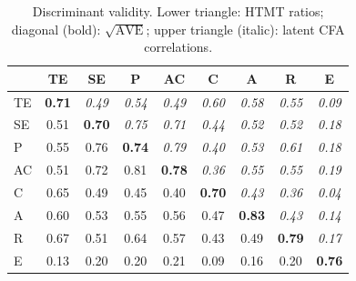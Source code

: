 \begin{table}[!htbp]
\centering
\caption{Discriminant validity. Lower triangle: HTMT ratios; diagonal (bold): $\sqrt{\mathrm{AVE}}$; upper triangle (italic): latent CFA correlations.}
\label{tab:htmt}
\footnotesize
\setlength{\tabcolsep}{3.5pt}
\begin{tabular}{lcccccccc}
\toprule
 & TE & SE & P & AC & C & A & R & E\\
\midrule
TE & \textbf{0.71} & \textit{0.49} & \textit{0.54} & \textit{0.49} & \textit{0.60} & \textit{0.58} & \textit{0.55} & \textit{0.09}\\
SE & 0.51 & \textbf{0.70} & \textit{0.75} & \textit{0.71} & \textit{0.44} & \textit{0.52} & \textit{0.52} & \textit{0.18}\\
P & 0.55 & 0.76 & \textbf{0.74} & \textit{0.79} & \textit{0.40} & \textit{0.53} & \textit{0.61} & \textit{0.18}\\
AC & 0.51 & 0.72 & 0.81 & \textbf{0.78} & \textit{0.36} & \textit{0.55} & \textit{0.55} & \textit{0.19}\\
C & 0.65 & 0.49 & 0.45 & 0.40 & \textbf{0.70} & \textit{0.43} & \textit{0.36} & \textit{0.04}\\
A & 0.60 & 0.53 & 0.55 & 0.56 & 0.47 & \textbf{0.83} & \textit{0.43} & \textit{0.14}\\
R & 0.67 & 0.51 & 0.64 & 0.57 & 0.43 & 0.49 & \textbf{0.79} & \textit{0.17}\\
E & 0.13 & 0.20 & 0.20 & 0.21 & 0.09 & 0.16 & 0.20 & \textbf{0.76}\\
\bottomrule
\end{tabular}
\end{table}
